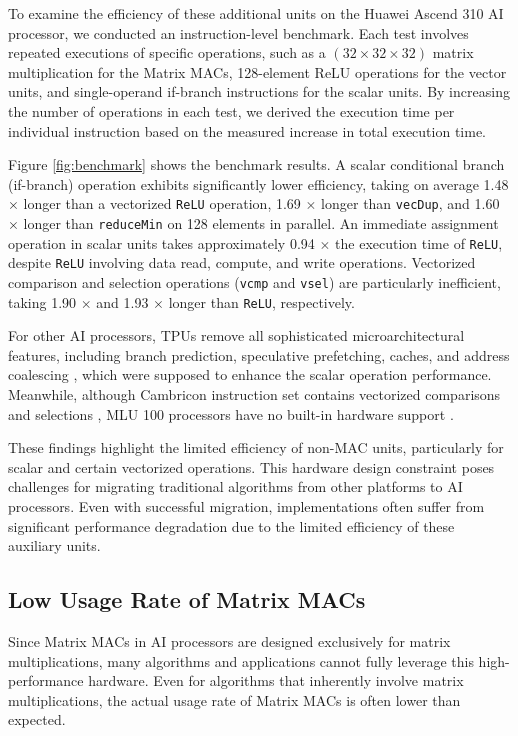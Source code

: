 To examine the efficiency of these additional units on the Huawei Ascend 310 AI processor, we conducted an instruction-level benchmark. Each test involves repeated executions of specific operations, such as a $(32 \times 32 \times 32)$ matrix multiplication for the Matrix MACs, 128-element ReLU operations for the vector units, and single-operand if-branch instructions for the scalar units. By increasing the number of operations in each test, we derived the execution time per individual instruction based on the measured increase in total execution time.

Figure \ref{fig:benchmark} shows the benchmark results. A scalar conditional branch (if-branch) operation exhibits significantly lower efficiency, taking on average 1.48 $\times$ longer than a vectorized \verb|ReLU| operation, 1.69 $\times$ longer than \verb|vecDup|, and 1.60 $\times$ longer than \verb|reduceMin| on 128 elements in parallel. An immediate assignment operation in scalar units takes approximately 0.94 $\times$ the execution time of \verb|ReLU|, despite \verb|ReLU| involving data read, compute, and write operations. Vectorized comparison and selection operations (\verb|vcmp| and \verb|vsel|) are particularly inefficient, taking 1.90 $\times$ and 1.93 $\times$ longer than \verb|ReLU|, respectively.

For other AI processors, TPUs remove all sophisticated microarchitectural features, including branch prediction, speculative prefetching, caches, and address coalescing \cite{DBLP:conf/isca/JouppiYPPABBBBB17}, which were supposed to enhance the scalar operation performance. Meanwhile,
although Cambricon instruction set contains vectorized comparisons and selections \cite{BANG}, MLU 100 processors have no built-in hardware support \cite{DevP}.

These findings highlight the limited efficiency of non-MAC units, particularly for scalar and certain vectorized operations. This hardware design constraint poses challenges for migrating traditional algorithms from other platforms to AI processors. Even with successful migration, implementations often suffer from significant performance degradation due to the limited efficiency of these auxiliary units.

\subsection{Low Usage Rate of Matrix MACs}

Since Matrix MACs in AI processors are designed exclusively for matrix multiplications, many algorithms and applications cannot fully leverage this high-performance hardware. Even for algorithms that inherently involve matrix multiplications, the actual usage rate of Matrix MACs is often lower than expected.

